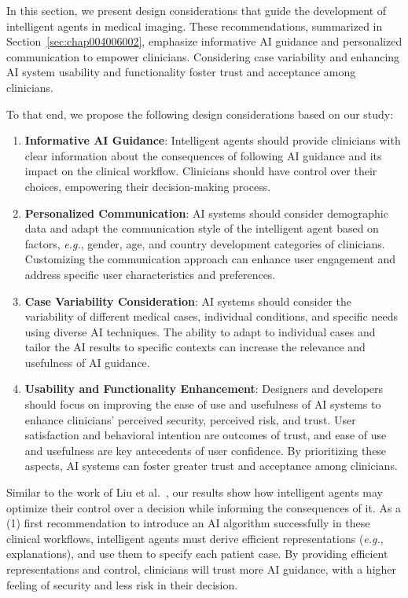 In this section, we present design considerations that guide the development of intelligent agents in medical imaging.
These recommendations, summarized in Section~\ref{sec:chap004006002}, emphasize informative \ac{AI} guidance and personalized communication to empower clinicians.
Considering case variability and enhancing \ac{AI} system usability and functionality foster trust and acceptance among clinicians.

\vspace{1.50mm}

\noindent
To that end, we propose the following design considerations based on our study:

\vspace{0.05mm}

\begin{enumerate}
\item {\bf Informative \ac{AI} Guidance}: Intelligent agents should provide clinicians with clear information about the consequences of following \ac{AI} guidance and its impact on the clinical workflow. Clinicians should have control over their choices, empowering their decision-making process.
\item {\bf Personalized Communication}: \ac{AI} systems should consider demographic data and adapt the communication style of the intelligent agent based on factors, {\it e.g.}, gender, age, and country development categories of clinicians. Customizing the communication approach can enhance user engagement and address specific user characteristics and preferences.
\item {\bf Case Variability Consideration}: \ac{AI} systems should consider the variability of different medical cases, individual conditions, and specific needs using diverse AI techniques. The ability to adapt to individual cases and tailor the \ac{AI} results to specific contexts can increase the relevance and usefulness of \ac{AI} guidance.
\item {\bf Usability and Functionality Enhancement}: Designers and developers should focus on improving the ease of use and usefulness of \ac{AI} systems to enhance clinicians' perceived security, perceived risk, and trust. User satisfaction and behavioral intention are outcomes of trust, and ease of use and usefulness are key antecedents of user confidence. By prioritizing these aspects, \ac{AI} systems can foster greater trust and acceptance among clinicians.
\end{enumerate}

Similar to the work of Liu et al.~\cite{LIU2022107026}, our results show how intelligent agents may optimize their control over a decision while informing the consequences of it.
As a (1) first recommendation to introduce an \ac{AI} algorithm successfully in these clinical workflows, intelligent agents must derive efficient representations ({\it e.g.}, explanations), and use them to specify each patient case.
By providing efficient representations and control, clinicians will trust more \ac{AI} guidance, with a higher feeling of security and less risk in their decision.

